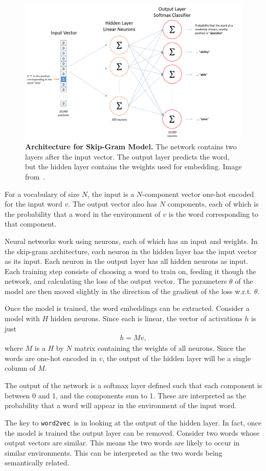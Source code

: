 \documentclass{article} %
\newcommand{\wordtvec}{\texttt{word2vec}}
\begin{document}
\begin{figure}[h]
	\centering
	\includegraphics[width=.5\textwidth]{skip_gram_net_arch}
	\caption{\textbf{Architecture for Skip-Gram Model.} The network contains two layers after the input vector. The output layer predicts the word, but the hidden layer contains the weights used for embedding. Image from~\cite{mccormick}.}
	\label{fig:skipgram}
\end{figure}

For a vocabulary of size $N$, the input is a $N$-component vector one-hot encoded for the input word $v$. The output vector also has $N$ components, each of which is the probability that a word in the environment of $v$ is the word corresponding to that component. 

Neural networks work using neurons, each of which has an input and weights. In the skip-gram architecture, each neuron in the hidden layer has the input vector as its input. Each neuron in the output layer has all hidden neurons as input. Each training step consists of choosing a word to train on, feeding it though the network, and calculating the loss of the output vector. The parameters $\theta$ of the model are then moved slightly in the direction of the gradient of the loss w.r.t. $\theta$.

Once the model is trained, the word embeddings can be extracted. Consider a model with $H$ hidden neurons. Since each is linear, the vector of activations $h$ is just
\begin{align}
h=Mv, \label{eqn:hidden}
\end{align}
where $M$ is a $H$ by $N$ matrix containing the weights of all neurons. Since the words are one-hot encoded in $v$, the output of the hidden layer will be a single column of $M$. 

The output of the network is a softmax layer defined such that each component is between 0 and 1, and the components sum to 1. These are interpreted as the probability that a word will appear in the environment of the input word.

The key to \wordtvec\ is in looking at the output of the hidden layer. In fact, once the model is trained the output layer can be removed. Consider two words whose output vectors are similar. This means the two words are likely to occur in similar environments. This can be interpreted as the two words being semantically related. 
\end{document}
